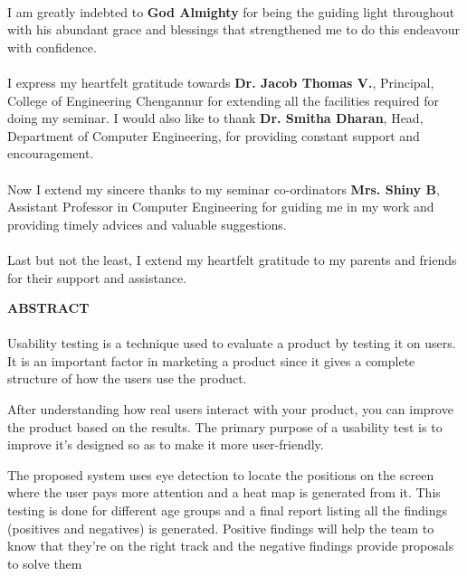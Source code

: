 \documentclass[a4paper,12pt,oneside]{article}
\begin{document}
\paragraph{}
I am greatly indebted to \textbf{God Almighty} for being the guiding light throughout with his
abundant grace and blessings that strengthened me to do this endeavour with confidence.
\paragraph{}
I express my heartfelt gratitude towards \textbf{Dr. Jacob Thomas V.}, Principal, College
of Engineering Chengannur for extending all the facilities required for doing my seminar.
I would also like to thank \textbf{Dr. Smitha Dharan}, Head, Department of Computer
Engineering, for providing constant support and encouragement.
\paragraph{}
Now I extend my sincere thanks to my seminar co-ordinators \textbf{Mrs. Shiny B}, Assistant
Professor in Computer Engineering for guiding me in my work and providing timely
advices and valuable suggestions.
\paragraph{}
Last but not the least, I extend my heartfelt gratitude to my parents and friends for
their support and assistance.	

\newpage
\begin{center}
\large{\textbf{ABSTRACT}}
\end{center}
\vspace{4ex}
\paragraph{}
Usability testing is a technique used to evaluate a product by testing it on users. It is an important factor in marketing a product since it gives a complete structure of how the users use the product.

After understanding how real users interact with your product, you can improve the product based on the results. The primary purpose of a usability test is to improve it’s designed so as to make it more user-friendly.

The proposed system uses eye detection to locate the positions on the screen where the user pays more attention and a heat map is generated from it. This testing is done for different age groups and a final report listing all the findings (positives and negatives) is generated. Positive findings will help the team to know that they’re on the right track and the negative findings provide proposals to solve them
\end{document}
